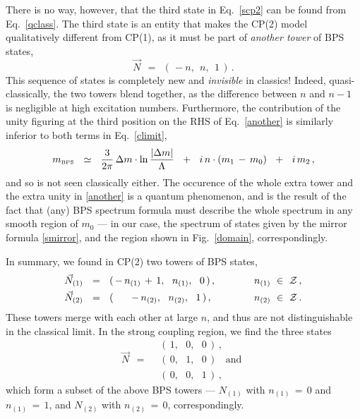 \documentclass[epsfig,12pt]{article}
\def\beq{\begin{equation}}
\def\eeq{\end{equation}}
\def\beq{\begin{equation}}
\def\eeq{\end{equation}}
\newcommand{\mc}[1]{\mathcal{#1}}
\newcommand{\mbps}{m_{\text{\tiny BPS}}}
\begin{document}
	There is no way, however, that the third state in Eq.~\eqref{scp2} can be found from
	Eq.~\eqref{qclass}.
	The third state is an entity that makes the CP(2) model qualitatively different from CP(1), 
	as it must be part of {\it another tower} of BPS states,
\beq
\label{another}
	\vec{N} ~~=~~ (\, -n,~~ n,~~ 1 \,)\,.
\eeq
	This sequence of states is completely new and {\it invisible} in classics!
	Indeed, quasi-classically, the two towers blend together, as the difference
	between $ n $ and $ n - 1 $ is negligible at high excitation numbers. 
	Furthermore, the contribution of the unity figuring at the third position 
	on the RHS of Eq.~\eqref{another}
	is similarly inferior to both terms in Eq.~\eqref{climit},
\beq
	\mbps ~~\simeq~~ \frac{3}{2\pi}\,
			\Delta m \cdot \ln \frac{|\Delta m|}{\Lambda}  
			    ~~+~~
			i\, n \cdot ( m_1 \,-\, m_0 )
			    ~~+~~
			i\, m_2\,,
\eeq
	and so is not seen classically either.
	The occurence of the whole extra tower and the extra unity in \eqref{another} is
	a quantum phenomenon, and is the result of the fact that (any) BPS spectrum formula
	must describe the whole spectrum in any smooth region of $ m_0 $ ---
	in our case, the spectrum of states given by the mirror formula \eqref{smirror},
	and the region shown in Fig.~\ref{domain}, correspondingly.

	In summary, we found in CP(2) two towers of BPS states,
\begin{align}
%
\notag
	\vec{N}_{(1)} & ~~=~~ (\, -\,n_{(1)} \,+\, 1,~~ n_{(1)},~~ 0 \,)\,,\qquad\quad 
	& 
	n_{(1)} ~\in~ \mc{Z}\,,
	\\
%
\label{cp2towers}
	\vec{N}_{(2)} & ~~=~~ (\, ~~~~~-\,n_{(2)},~~ n_{(2)},~~ 1 \,)\,, \qquad\quad 
	& 
	n_{(2)} ~\in~ \mc{Z}\,.
\end{align}
	These towers merge with each other at large $ n $, and thus are not
	distinguishable in the classical limit.
	In the strong coupling region, we find the three states
\beq
	\vec{N} ~~=~~ 
			~~
				\begin{array}{l}
					(\, 1,~~~   0,~~~   0 \,)\,, \\[1.5mm]
					(\, 0,~~~   1,~~~   0 \,)~~~~ \text{and} \\[1.5mm]
					(\, 0,~~~   0,~~~   1 \,)\,,
				\end{array} 
\eeq
	which form a subset of the above BPS towers --- 
	$ N_{(1)} $ with $ n_{(1)} \,=\, 0 $ and  $ n_{(1)} \,=\, 1 $,
	and $ N_{(2)} $ with $ n_{(2)} \,=\, 0 $, correspondingly.
 
\end{document}

